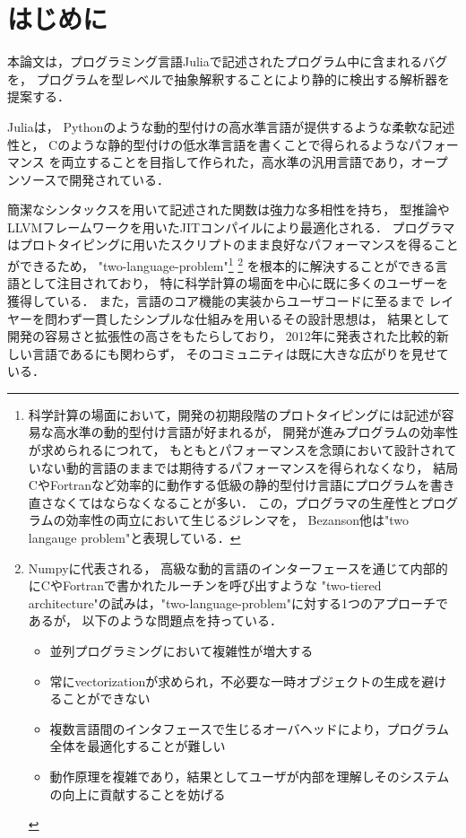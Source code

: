 
\section{はじめに}

本論文は，プログラミング言語Juliaで記述されたプログラム中に含まれるバグを，
プログラムを型レベルで抽象解釈することにより静的に検出する解析器を提案する．

Julia\cite{julia}は，
Pythonのような動的型付けの高水準言語が提供するような柔軟な記述性と，
Cのような静的型付けの低水準言語を書くことで得られるようなパフォーマンス
を両立することを目指して作られた，高水準の汎用言語であり，オープンソースで開発されている．

簡潔なシンタックスを用いて記述された関数は強力な多相性を持ち，
型推論やLLVMフレームワークを用いたJITコンパイルにより最適化される．
プログラマはプロトタイピングに用いたスクリプトのまま良好なパフォーマンスを得ることができるため，
"two-language-problem"\footnote{
  科学計算の場面において，開発の初期段階のプロトタイピングには記述が容易な高水準の動的型付け言語が好まれるが，
  開発が進みプログラムの効率性が求められるにつれて，
  もともとパフォーマンスを念頭において設計されていない動的言語のままでは期待するパフォーマンスを得られなくなり，
  結局CやFortranなど効率的に動作する低級の静的型付け言語にプログラムを書き直さなくてはならなくなることが多い．
  この，プログラマの生産性とプログラムの効率性の両立において生じるジレンマを，
  Bezanson他は"two langauge problem"\cite{julia-2012, Julia-2017}と表現している．
} \footnote{
  Numpy\cite{numpy}に代表される，
  高級な動的言語のインターフェースを通じて内部的にCやFortranで書かれたルーチンを呼び出すような
  "two-tiered architecture"の試みは，"two-language-problem"に対する1つのアプローチであるが，
  以下のような問題点を持っている\cite{julia-2012}．
  \begin{itemize}
    \item 並列プログラミングにおいて複雑性が増大する
    \item 常にvectorizationが求められ，不必要な一時オブジェクトの生成を避けることができない
    \item 複数言語間のインタフェースで生じるオーバヘッドにより，プログラム全体を最適化することが難しい
    \item 動作原理を複雑であり，結果としてユーザが内部を理解しそのシステムの向上に貢献することを妨げる
  \end{itemize}
} を根本的に解決することができる言語として注目されており，
特に科学計算の場面を中心に既に多くのユーザーを獲得している\cite{julia-growth}．
また，言語のコア機能の実装からユーザコードに至るまで
レイヤーを問わず一貫したシンプルな仕組みを用いるその設計思想は，
結果として開発の容易さと拡張性の高さをもたらしており\cite{julia-2012}，
2012年に発表された比較的新しい言語であるにも関わらず，
そのコミュニティは既に大きな広がりを見せている．

